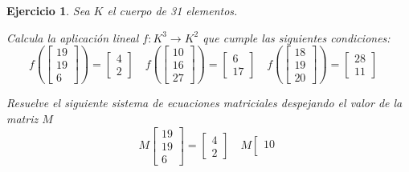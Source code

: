 \documentclass[12pt]{amsart}
\newtheorem{ejer}{Ejercicio}
\begin{document}
\begin{ejer} Sea $K$ el cuerpo de 31 elementos.
\newline
\noindent\begin{minipage}{\textwidth}
\begin{tcolorbox}[colback = green!20!white,title=Versión Aplicación]
Calcula la aplicaci\'on lineal $f:K^{3} \to K^{2}$ que cumple las siguientes condiciones: 
\[f\left(\left[\begin{array}{r}
19 \\
19 \\
6
\end{array}\right]\right) = \left[\begin{array}{r}
4 \\
2
\end{array}\right] \quad f\left(\left[\begin{array}{r}
10 \\
16 \\
27
\end{array}\right]\right) = \left[\begin{array}{r}
6 \\
17
\end{array}\right] \quad f\left(\left[\begin{array}{r}
18 \\
19 \\
20
\end{array}\right]\right) = \left[\begin{array}{r}
28 \\
11
\end{array}\right] \quad 
\]\end{tcolorbox}
\end{minipage} \newline
\noindent\begin{minipage}{\textwidth}
\begin{tcolorbox}[colback = blue!20!white,title=Versión Sistema Matricial]
Resuelve el siguiente sistema de ecuaciones matriciales despejando el valor de la matriz $M$
\[M \left[\begin{array}{r}
19 \\
19 \\
6
\end{array}\right] = \left[\begin{array}{r}
4 \\
2
\end{array}\right] \quad M \left[\begin{array}{r}
10 \\

\end{array}\]
\end{tcolorbox}
\end{minipage}
\end{ejer}
\end{document}
